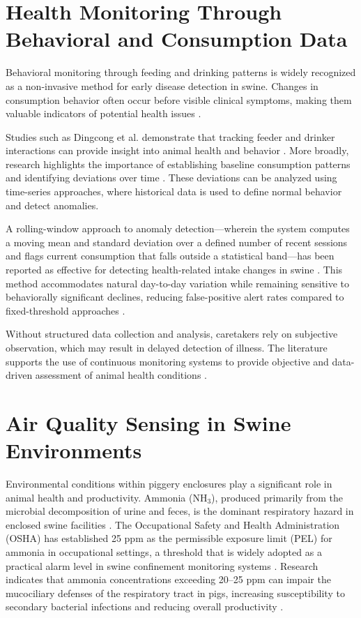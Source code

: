 \section{Health Monitoring Through Behavioral and Consumption Data}

Behavioral monitoring through feeding and drinking patterns is widely recognized as a non-invasive method for early disease detection in swine. Changes in consumption behavior often occur before visible clinical symptoms, making them valuable indicators of potential health issues \cite{dingcong2017monitoring, sadeghi2023improving}.

Studies such as Dingcong et al. demonstrate that tracking feeder and drinker interactions can provide insight into animal health and behavior \cite{dingcong2017monitoring}. More broadly, research highlights the importance of establishing baseline consumption patterns and identifying deviations over time \cite{sadeghi2023improving, racewicz2021welfare}. These deviations can be analyzed using time-series approaches, where historical data is used to define normal behavior and detect anomalies.

A rolling-window approach to anomaly detection---wherein the system computes a moving mean and standard deviation over a defined number of recent sessions and flags current consumption that falls outside a statistical band---has been reported as effective for detecting health-related intake changes in swine \cite{sadeghi2023improving, racewicz2021welfare}. This method accommodates natural day-to-day variation while remaining sensitive to behaviorally significant declines, reducing false-positive alert rates compared to fixed-threshold approaches \cite{sadeghi2023improving}.

Without structured data collection and analysis, caretakers rely on subjective observation, which may result in delayed detection of illness. The literature supports the use of continuous monitoring systems to provide objective and data-driven assessment of animal health conditions \cite{dingcong2017monitoring, racewicz2021welfare}.


\section{Air Quality Sensing in Swine Environments}

Environmental conditions within piggery enclosures play a significant role in animal health and productivity. Ammonia ($\text{NH}_3$), produced primarily from the microbial decomposition of urine and feces, is the dominant respiratory hazard in enclosed swine facilities \cite{purdue2019ammonia, pig2013airquality}. The Occupational Safety and Health Administration (OSHA) has established 25 ppm as the permissible exposure limit (PEL) for ammonia in occupational settings, a threshold that is widely adopted as a practical alarm level in swine confinement monitoring systems \cite{purdue2019ammonia, pig2013airquality}. Research indicates that ammonia concentrations exceeding 20--25 ppm can impair the mucociliary defenses of the respiratory tract in pigs, increasing susceptibility to secondary bacterial infections and reducing overall productivity \cite{purdue2019ammonia, sadeghi2023improving}.

